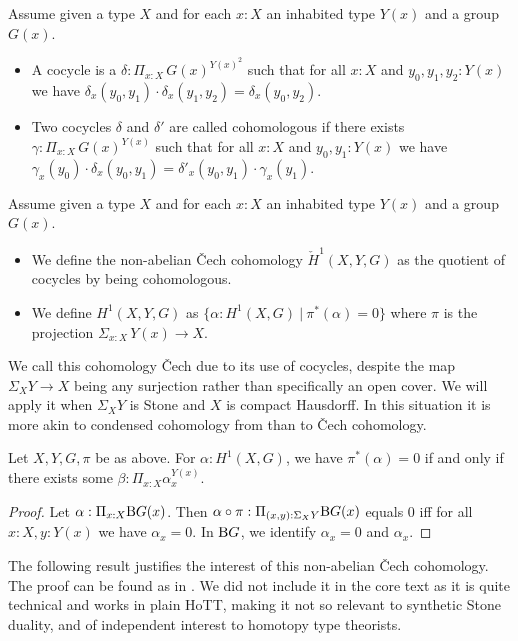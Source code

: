 \begin{definition}\label{dfnCocycle}
Assume given a type $X$  and for each $x:X$ an inhabited type $Y(x)$ and a group $G(x)$.
\begin{itemize}
\item A cocycle is a $\delta:\Pi_{x:X}\,G(x)^{Y(x)^2}$ such that for all $x:X$ and $y_0,y_1,y_2:Y(x)$ we have $\delta_x(y_0,y_1)\cdot \delta_x(y_1,y_2) = \delta_x(y_0,y_2)$.
\item Two cocycles $\delta$ and $\delta'$ are called cohomologous if there exists $\gamma:\Pi_{x:X}\,G(x)^{Y(x)}$ such that for all $x:X$ and $y_0,y_1:Y(x)$ we have $\gamma_x(y_0)\cdot\delta_x(y_0,y_1) = \delta'_x(y_0,y_1)\cdot\gamma_x(y_1)$.
\end{itemize}
\end{definition}

\begin{definition}\label{dfnCechCohomology}
Assume given a type $X$  and for each $x:X$ an inhabited type $Y(x)$ and a group $G(x)$. 
\begin{itemize}
\item We define the non-abelian \v{C}ech cohomology $\check{H}^1(X,Y,G)$ as the quotient of cocycles by being cohomologous.
\item We define $H^1(X,Y,G)$ as $\{\alpha:H^1(X,G)\ |\ \pi^*(\alpha) = 0\}$ where $\pi$ is the projection $\Sigma_{x:X}\,Y(x)\to X$.
\end{itemize}
\end{definition}

\begin{remark}
We call this cohomology \v{C}ech due to its use of cocycles, despite the map $\Sigma_XY\to X$ being any surjection rather than specifically an open cover. We will apply it when $\Sigma_XY$ is Stone and $X$ is compact Hausdorff. In this situation it is more akin to condensed cohomology from \cite{Condensed} than to \v{C}ech cohomology.
\end{remark}

\begin{lemma}\label{CechConditionEquivalentStatement}
  Let $X,Y,G,\pi$ be as above. For $\alpha : H^1(X,G)$, we have $\pi^*(\alpha) = 0$ if and only if there exists some $\beta:\Pi_{x:X}\alpha_x^{Y(x)}$. 
\end{lemma}
\begin{proof}
  Let $\alpha: \Pi_{x:X} \mathrm{B} G(x)$. Then $\alpha \circ \pi : \Pi_{(x,y):\Sigma_XY} \mathrm{B} G(x)$ equals $0$ iff for all $x:X, y:Y(x)$ we have $\alpha_x = 0$. In $\mathrm{B} G$, we identify $\alpha_x =0$ and $\alpha_x$. 
\end{proof}
The following result justifies the interest of this non-abelian \v{C}ech cohomology. The proof can be found as  in . We did not include it in the core text as it is quite technical and works in plain HoTT, making it not so relevant to synthetic Stone duality, and of independent interest to homotopy type theorists.

